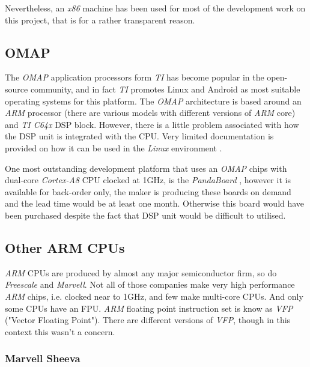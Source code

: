   Nevertheless, an \emph{x86} machine has been used for most of the
 development work on this project, that is for a rather transparent
 reason.


\subsection{OMAP}

  The \emph{OMAP} application processors form \emph{TI} has become
 popular in the open-source community, and in fact \emph{TI} promotes
 Linux and Android as most suitable operating systems for this platform.
 The \emph{OMAP} architecture is based around an \emph{ARM} processor
 (there are various models with different versions of \emph{ARM} core)
 and \emph{TI C64x} DSP block. However, there is a little problem
 associated with how the DSP unit is integrated with the CPU.
 Very limited documentation is provided on how it can be used in the
 \emph{Linux} environment \cite{ti:omap:wiki:dsp}.

 One most outstanding development platform that uses an \emph{OMAP}
 chips with dual-core \emph{Cortex-A8} CPU clocked at 1GHz, is the
 \emph{PandaBoard} \cite{ti:omap:wiki:pb}, however it is available
 for back-order only, the maker is producing these boards on demand
 and the lead time would be at least one month. Otherwise this board
 would have been purchased despite the fact that DSP unit would be
 difficult to utilised.


\subsection{Other ARM CPUs}

  \emph{ARM} CPUs are produced by almost any major semiconductor firm,
 so do \emph{Freescale} and \emph{Marvell}. Not all of those companies
 make very high performance \emph{ARM} chips, i.e. clocked near to 1GHz,
 and few make multi-core CPUs. And only some CPUs have an FPU.
 \emph{ARM} floating point instruction set is know as \emph{VFP}
 ("Vector Floating Point"). There are different versions of \emph{VFP},
 though in this context this wasn't a concern.

\subsubsection{Marvell Sheeva}

